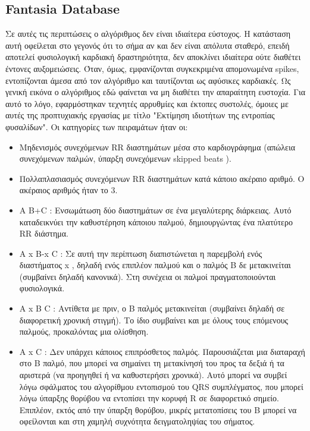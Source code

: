 
%
 
 \subsection{\en Fantasia Database \gr}
  Σε αυτές τις περιπτώσεις ο αλγόριθμος δεν είναι ιδιαίτερα εύστοχος. Η κατάσταση αυτή οφείλεται στο γεγονός ότι το σήμα αν και δεν είναι απόλυτα σταθερό, επειδή αποτελεί φυσιολογική καρδιακή δραστηριότητα, δεν αποκλίνει ιδιαίτερα ούτε διαθέτει έντονες αυξομειώσεις. Όταν, όμως, εμφανίζονται συγκεκριμένα απομονωμένα \en spikes, \gr εντοπίζονται άμεσα από τον αλγόριθμο και ταυτίζονται ως αφύσικες καρδιακές. Ως γενική εικόνα ο αλγόριθμος εδώ φαίνεται να μη διαθέτει την απαραίτητη ευστοχία. Για αυτό το λόγο, εφαρμόστηκαν τεχνητές αρρυθμίες και έκτοπες συστολές, όμοιες με αυτές της προπτυχιακής εργασίας με τίτλο "Εκτίμηση ιδιοτήτων της εντροπίας φυσαλίδων". Οι κατηγορίες των πειραμάτων ήταν οι:
  \begin{itemize}
      \item Μηδενισμός συνεχόμενων \en RR \gr διαστημάτων μέσα στο καρδιογράφημα (απώλεια συνεχόμενων παλμών, ύπαρξη συνεχόμενων \en skipped beats \gr).
      \item Πολλαπλασιασμός συνεχόμενων \en RR \gr διαστημάτων κατά κάποιο ακέραιο αριθμό. Ο ακέραιος αριθμός ήταν το 3.
      \item \en A B+C \gr: Ενσωμάτωση δύο διαστημάτων σε ένα μεγαλύτερης διάρκειας. Αυτό καταδεικνύει την καθυστέρηση κάποιου παλμού, δημιουργώντας ένα πλατύτερο \en RR \gr διάστημα.
      \item \en A x B-x C \gr: Σε αυτή την περίπτωση διαπιστώνεται η παρεμβολή ενός διαστήματος \en x \gr, δηλαδή ενός επιπλέον παλμού και ο παλμός Β δε μετακινείται (συμβαίνει δηλαδή κανονικά). Στη συνέχεια οι παλμοί πραγματοποιούνται φυσιολογικά.
      \item \en A x B C \gr: Αντίθετα με πριν, ο Β παλμός μετακινείται (συμβαίνει δηλαδή σε διαφορετική χρονική στιγμή). Το ίδιο συμβαίνει και με όλους τους επόμενους παλμούς, προκαλόντας μια ολίσθηση.
      \item \en A x C \gr: Δεν υπάρχει κάποιος επιπρόσθετος παλμός. Παρουσιάζεται μια διαταραχή στο Β παλμό, που μπορεί να σημαίνει τη μετακίνησή του προς τα δεξιά ή τα αριστερά (να προηγηθεί ή να καθυστερήσει χρονικά). Αυτό μπορεί να συμβεί λόγω σφάλματος του αλγορίθμου εντοπισμού του \en QRS \gr συμπλέγματος, που μπορεί λόγω ύπαρξης θορύβου να εντοπίσει την κορυφή \en R \gr σε διαφορετικό σημείο. Επιπλέον, εκτός από την ύπαρξη θορύβου, μικρές μετατοπίσεις του Β μπορεί να οφείλονται και στη χαμηλή συχνότητα δειγματοληψίας του σήματος.
  \end{itemize}

